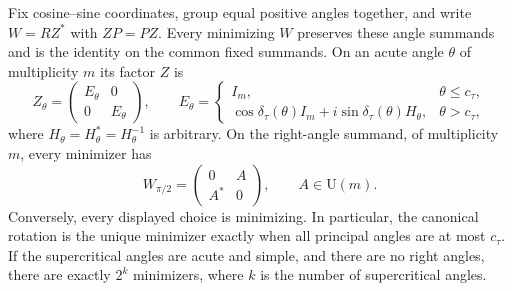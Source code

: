 \begin{theorem}
\label{thm:smoothed-all-minimizers}
Fix cosine--sine coordinates, group equal positive angles together, and
write $W=RZ^*$ with $ZP=PZ$. Every minimizing $W$ preserves these angle
summands and is the identity on the common fixed summands. On an acute
angle $\theta$ of multiplicity $m$ its factor $Z$ is
\[
 Z_\theta=\begin{pmatrix}E_\theta&0\\0&E_\theta\end{pmatrix},
 \qquad
 E_\theta=
 \begin{cases}
  I_m,&\theta\leq c_\tau,\\
  \cos\delta_\tau(\theta)I_m+
    i\sin\delta_\tau(\theta)H_\theta,&\theta>c_\tau,
 \end{cases}
\]
where $H_\theta=H_\theta^*=H_\theta^{-1}$ is arbitrary.
On the right-angle summand, of multiplicity $m$, every minimizer has
\[
 W_{\pi/2}=\begin{pmatrix}0&A\\A^*&0\end{pmatrix},
 \qquad A\in\mathrm U(m).
\]
Conversely, every displayed choice is minimizing. In particular, the
canonical rotation is the unique minimizer exactly when all principal
angles are at most $c_\tau$. If the supercritical angles are acute and
simple, and there are no right angles, there are exactly $2^k$ minimizers,
where $k$ is the number of supercritical angles.
\end{theorem}

